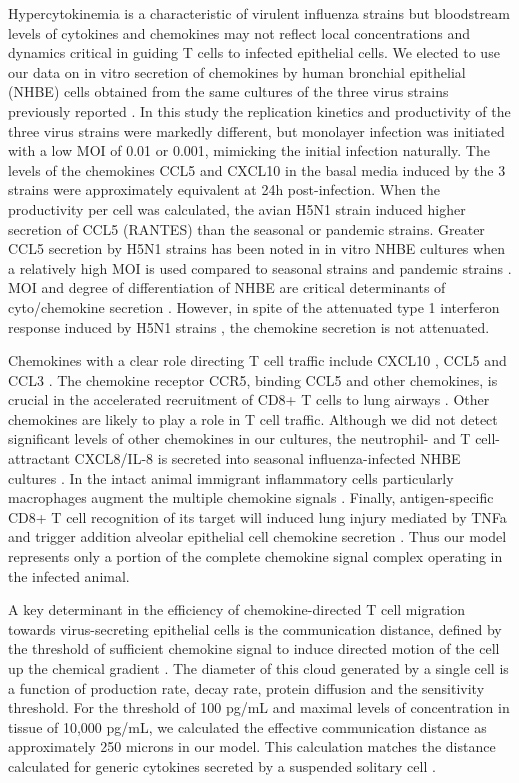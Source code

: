 \documentclass[10pt]{article}
\begin{document}
Hypercytokinemia is a characteristic of virulent influenza strains \cite{DeJong2006} but bloodstream levels of cytokines and chemokines may not reflect local concentrations and dynamics critical in guiding T cells to infected epithelial cells.  We elected to use our data on in vitro secretion of chemokines by human bronchial epithelial (NHBE) cells obtained from the same cultures of the three virus strains previously reported \cite{Mitchell2011}.  In this study the replication kinetics and productivity of the three virus strains were markedly different, but monolayer infection was initiated with a low MOI of 0.01 or 0.001, mimicking the initial infection naturally.  The levels of the chemokines CCL5 and CXCL10 in the basal media induced by the 3 strains were approximately equivalent at 24h post-infection.  When the productivity per cell was calculated, the avian H5N1 strain induced higher secretion of CCL5 (RANTES) than the seasonal or pandemic strains.  Greater CCL5 secretion by H5N1 strains has been noted in in vitro NHBE cultures when a relatively high MOI is used compared to seasonal strains \cite{Chan2005, Chan2010, Zeng2011} and pandemic strains \cite{Zeng2011}.  MOI and degree of differentiation of NHBE are critical determinants of cyto/chemokine secretion \cite{Chan2010}.  However, in spite of the attenuated type 1 interferon response induced by H5N1 strains \cite{Zeng2007}, the chemokine secretion is not attenuated.

Chemokines with a clear role directing T cell traffic include CXCL10 \cite{Dufour2002}, CCL5 \cite{Kawai1999} and CCL3 \cite{Kawai1999}.  The chemokine receptor CCR5, binding CCL5 and other chemokines, is crucial in the accelerated recruitment of CD8+ T cells to lung airways \cite{Kohlmeier2008}.  Other chemokines are likely to play a role in T cell traffic.  Although we did not detect significant levels of other chemokines in our cultures, the neutrophil- and T cell-attractant CXCL8/IL-8 is secreted into seasonal influenza-infected NHBE cultures \cite{Matsukura1996, Arndt2002}.  In the intact animal immigrant inflammatory cells particularly macrophages augment the multiple chemokine signals \cite{Julkunen2000}.  Finally, antigen-specific CD8+ T cell recognition of its target will induced lung injury mediated by TNFa and trigger addition alveolar epithelial cell chemokine secretion \cite{Zhao2000}.   Thus our model represents only a portion of the complete chemokine signal complex operating in the infected animal.

A key determinant in the efficiency of chemokine-directed T cell migration towards virus-secreting epithelial cells is the communication distance, defined by the threshold of sufficient chemokine signal to induce directed motion of the cell up the chemical gradient \cite{Thelen2008}.  The diameter of this cloud generated by a single cell is a function of production rate, decay rate, protein diffusion and the sensitivity threshold.  For the threshold of 100 pg/mL and maximal levels of concentration in tissue of 10,000 pg/mL, we calculated the effective communication distance as approximately 250 microns in our model.  This calculation matches the distance calculated for generic cytokines secreted by a suspended solitary cell \cite{Francis1997}.
\end{document}
